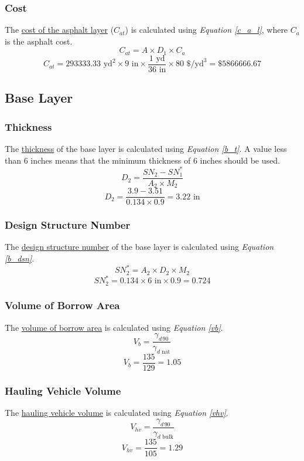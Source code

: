 \documentclass{article}
\begin{document}
\subsubsection{Cost}
\noindent The \underline{cost of the asphalt layer} ($C_{at}$) is calculated using \emph{Equation \ref{c_a_l}}, where $C_a$ is the asphalt cost.
\begin{equation}\label{c_a_l}C_{at}=A\times D_1\times C_a\end{equation}
\[C_{at}=293333.33\text{ yd}^2\times 9\text{ in}\times \frac{1\text{ yd}}{36\text{ in}}\times 80\text{ \$/yd}^3=\boxed{\$5866666.67}\]
\subsection{Base Layer}
\subsubsection{Thickness}
\noindent The \underline{thickness} of the base layer is calculated using \emph{Equation \ref{b_t}}. A value less than 6 inches means that the minimum thickness of 6 inches should be used. 
\begin{equation}\label{b_t}D_2=\frac{SN_2-SN_1^*}{A_2\times M_2}\end{equation}
\[D_2=\frac{3.9-3.51}{0.134\times 0.9}=\boxed{3.22\text{ in}}\]
\subsubsection{Design Structure Number} 
\noindent The \underline{design structure number} of the base layer is calculated using \emph{Equation \ref{b_dsn}}.
\begin{equation}\label{b_dsn}SN_2^*=A_2\times D_2\times M_2\end{equation}
\[SN_2^*=0.134\times 6\text{ in}\times 0.9=\boxed{0.724}\]
\subsubsection{Volume of Borrow Area} 
\noindent The \underline{volume of borrow area} is calculated using \emph{Equation \ref{vb}}.
\begin{equation}\label{vb}V_b=\frac{\gamma_{d\,90}}{\gamma_{d\text{ nat}}}\end{equation}
\[V_b=\frac{135}{129}=\boxed{1.05}\]
\subsubsection{Hauling Vehicle Volume} 
\noindent The \underline{hauling vehicle volume} is calculated using \emph{Equation \ref{vhv}}.
\begin{equation}\label{vhv}V_{hv}=\frac{\gamma_{d\,90}}{\gamma_{d\text{ bulk}}}\end{equation}
\[V_{hv}=\frac{135}{105}=\boxed{1.29}\]
\end{document}
